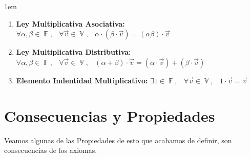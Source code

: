 \documentclass[12pt, fleqn]{report}                             %
\newenvironment{SmallIndentation}[1][0.75em]                    %
        {\begin{adjustwidth}{#1}{}\begin{footnotesize}}             %
        {\end{footnotesize}\end{adjustwidth}}                       %
\DeclareMathOperator \Space {\quad}                             %
\DeclareMathOperator \MiniSpace {\;}                            %
\theoremstyle{break}                                            %
\DeclareMathOperator \GenericField {\mathbb{F}}                 %
\DeclareMathOperator \VectorSet    {\mathbb{V}}                 %
\begin{document}
\begin{SmallIndentation}[1em]
\begin{enumerate}
                        \item 
                            \textbf{Ley Multiplicativa Asociativa:}
                            $\forall \alpha, \beta \in \GenericField, \MiniSpace
                                \forall \vec{v} \in \VectorSet, \MiniSpace
                                    \alpha \cdot (\beta \cdot \vec{v}) = (\alpha \beta) \cdot \vec{v}$

                        \item 
                            \textbf{Ley Multiplicativa Distributiva:}
                            $\forall \alpha, \beta \in \GenericField, \MiniSpace
                                \forall \vec{v} \in \VectorSet, \MiniSpace
                                    (\alpha + \beta) \cdot \vec{v} = 
                                            (\alpha \cdot \vec{v}) + (\beta \cdot \vec{v})$

                        \item 
                            \textbf{Elemento Indentidad Multiplicativo:}
                            $\exists 1 \in \GenericField, \MiniSpace
                                \forall \vec{v} \in \VectorSet, \MiniSpace 1 \cdot \vec{v} = \vec{v}$

                    \end{enumerate}

                \end{SmallIndentation}




        \clearpage
        \section{Consecuencias y Propiedades}

            Veamos algunas de las Propiedades de esto que acabamos de definir, son consecuencias de los 
            axiomas.
\end{document}
